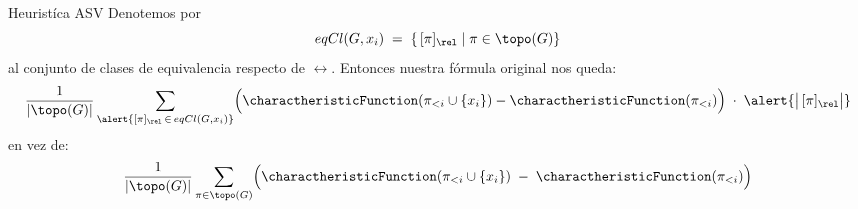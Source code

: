 \begin{frame}{Heuristíca ASV}
	Denotemos por 
	\[
	eqCl(G,x_i) \;=\; \{\,[\pi]_{\rel} \mid \pi \in \topo(G)\}
	\]
	al conjunto de clases de equivalencia respecto de \(\rel\). \pause Entonces nuestra fórmula original nos queda:
	\[
	\frac{1}{|\topo(G)|}\sum_{\alert{[\pi]_{\rel} \,\in\, eqCl(G,x_i)}} 
	\Bigl(\charactheristicFunction(\pi_{<i} \cup \{x_i\}) 
	- \charactheristicFunction(\pi_{<i})\Bigr) 
	\;\cdot\; \alert{\bigl|\,[\pi]_{\rel}\bigr|}
	\]    
	en vez de: 
	\[
	\frac{1}{|\topo(G)|}\sum_{\pi \in \topo(G)} 
	\Bigl(\charactheristicFunction(\pi_{<i} \cup \{x_i\})
	\;-\;\charactheristicFunction(\pi_{<i})\Bigr)
	\]
\end{frame}

